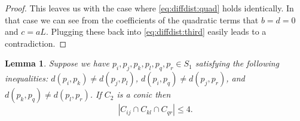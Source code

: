 \documentclass[12pt]{article}
\newtheorem{lemma}[theorem]{Lemma}
\begin{document}
\begin{proof}
 This leaves us with the case where \eqref{eq:diffdist:quad} holds identically.
 In that case we can see from the coefficients of the quadratic terms that $b=d=0$ and $c=aL$.
 Plugging these back into \eqref{eq:diffdist:third} easily leads to a contradiction.
 \end{proof}

  
\begin{lemma}\label{lem:conic}
 Suppose we have $p_i,p_j,p_k,p_l,p_q,p_r\in S_1$ satisfying the following inequalities:
 $d(p_i, p_k) \neq d(p_j, p_l)$, 
 $d(p_i, p_q) \neq d(p_j, p_r)$, and 
 $d(p_k, p_q) \neq d(p_l, p_r)$.
 If $C_2$ is a conic then
 $$|C_{ij}\cap C_{kl} \cap C_{qr}| \leq 4.$$
\end{lemma} 
\end{document}
